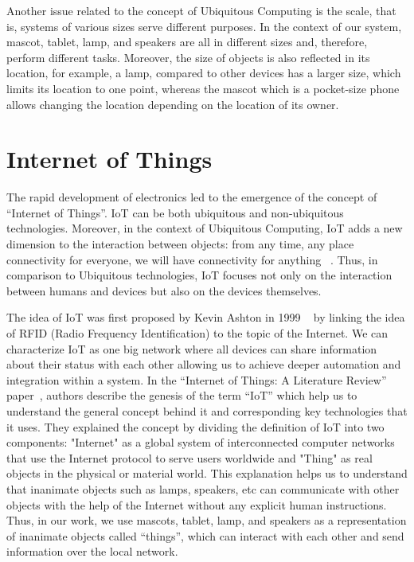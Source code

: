 Another issue related to the concept of Ubiquitous Computing is the scale,
that is, systems of various sizes serve different purposes.
In the context of our system, mascot, tablet, lamp, and speakers are all in
different sizes and, therefore, perform different tasks.
Moreover, the size of objects is also reflected in its location, for example, a lamp, compared
to other devices has a larger size, which limits its location to one point, whereas the mascot
which is a pocket-size phone allows changing the location depending on the location of its owner.

\section{Internet of Things}
\label{sec:Internet of Things}
The rapid development of electronics led to the emergence of the concept of “Internet of Things”.
IoT can be both ubiquitous and non-ubiquitous technologies.
Moreover, in the context of Ubiquitous
Computing, IoT adds a new dimension to the interaction between objects: from any time, any place
connectivity for everyone, we will have connectivity for anything ~\cite{tan2010future}.
Thus, in comparison to Ubiquitous technologies, IoT focuses not only on the interaction
between humans and devices but also on the devices themselves.

The idea of IoT was first proposed by Kevin Ashton in 1999 ~\cite{ashton2009internet}
by linking the idea of RFID (Radio Frequency Identification) to the topic of the Internet.
We can characterize IoT as one big network where all devices can share information about their status with
each other allowing us to achieve deeper automation and integration within a system.
In the “Internet of Things: A Literature Review” paper~\cite{madakam2015internet}, authors describe
the genesis of the term “IoT” which help us to understand the general concept behind it and
corresponding key technologies that it uses.
They explained the concept by dividing the definition of IoT into two components: "Internet"
as a global system of interconnected computer networks that use the Internet protocol to serve users worldwide
and "Thing" as real objects in the physical or material world.
This explanation helps us to understand that inanimate objects such as lamps, speakers,
etc can communicate with other objects with the help of the Internet without any explicit human instructions.
Thus, in our work, we use mascots, tablet, lamp, and speakers as a representation of inanimate
objects called “things”, which can interact with each other and send information over the local network.

